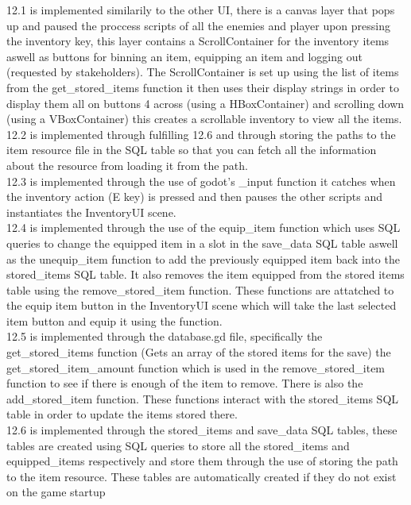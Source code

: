 \documentclass{article}
\begin{document}
        12.1 is implemented similarily to the other UI, there is a canvas layer that pops up and paused the proccess scripts of all the enemies and player upon pressing the inventory key, this layer contains a ScrollContainer for the inventory items aswell as buttons for binning an item, equipping an item and logging out (requested by stakeholders). The ScrollContainer is set up using the list of items from the get\_stored\_items function it then uses their display strings in order to display them all on buttons 4 across (using a HBoxContainer) and scrolling down (using a VBoxContainer) this creates a scrollable inventory to view all the items.\\
        12.2 is implemented through fulfilling 12.6 and through storing the paths to the item resource file in the SQL table so that you can fetch all the information about the resource from loading it from the path.\\
        12.3 is implemented through the use of godot's \_input function it catches when the inventory action (E key) is pressed and then pauses the other scripts and instantiates the InventoryUI scene.\\
        12.4 is implemented through the use of the equip\_item function which uses SQL queries to change the equipped item in a slot in the save\_data SQL table aswell as the unequip\_item function to add the previously equipped item back into the stored\_items SQL table. It also removes the item equipped from the stored items table using the remove\_stored\_item function. These functions are attatched to the equip item button in the InventoryUI scene which will take the last selected item button and equip it using the function.\\
        12.5 is implemented through the database.gd file, specifically the get\_stored\_items function (Gets an array of the stored items for the save) the get\_stored\_item\_amount function which is used in the remove\_stored\_item function to see if there is enough of the item to remove. There is also the add\_stored\_item function. These functions interact with the stored\_items SQL table in order to update the items stored there.\\
        12.6 is implemented through the stored\_items and save\_data SQL tables, these tables are created using SQL queries to store all the stored\_items and equipped\_items respectively and store them through the use of storing the path to the item resource. These tables are automatically created if they do not exist on the game startup\\
\end{document}
